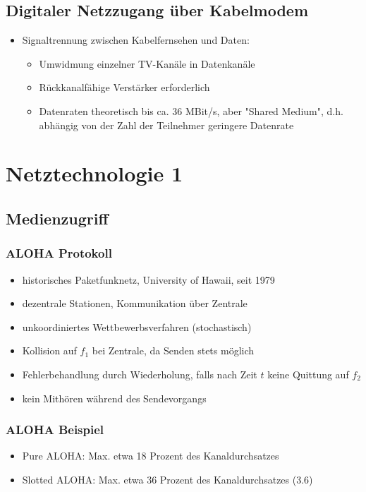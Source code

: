 \subsection{Digitaler Netzzugang über Kabelmodem}
\begin{itemize}
	\item Signaltrennung zwischen Kabelfernsehen und Daten:
	\begin{itemize}
		\item Umwidmung einzelner TV-Kanäle in Datenkanäle
		\item Rückkanalfähige Verstärker erforderlich
		\item Datenraten theoretisch bis ca. 36 MBit/s, aber "Shared Medium", d.h. abhängig von der Zahl der Teilnehmer geringere Datenrate
	\end{itemize}
\end{itemize}

\section{Netztechnologie 1}
\subsection{Medienzugriff}
\subsubsection{ALOHA Protokoll}
\begin{itemize}
	\item historisches Paketfunknetz, University of Hawaii, seit 1979
	\item dezentrale Stationen, Kommunikation über Zentrale
	\item unkoordiniertes Wettbewerbsverfahren (stochastisch)
	\item Kollision auf \(f_{1}\) bei Zentrale, da Senden stets möglich
	\item Fehlerbehandlung durch Wiederholung, falls nach Zeit \(t\) keine Quittung auf \(f_{2}\)
	\item kein Mithören während des Sendevorgangs
\end{itemize}
\subsubsection{ALOHA Beispiel}
\begin{itemize}
	\item Pure ALOHA: Max. etwa 18 Prozent des Kanaldurchsatzes
	\item Slotted ALOHA: Max. etwa 36 Prozent des Kanaldurchsatzes (3.6)
\end{itemize}
